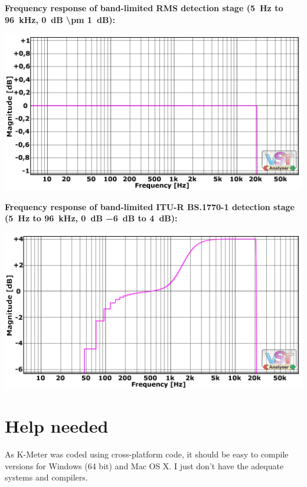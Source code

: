 \newpage %

\textbf{Frequency response of band-limited RMS detection stage
  (\SI{5}{\hertz} to \SI{96}{\kilo\hertz}, \SI{0}{\dB} \SI{\pm
    1}{\dB}):}

\begin{center}
  \includegraphics[scale=0.65,clip]{include/images/fft_192khz-freq_zoomed-rms.png}
\end{center}

\textbf{Frequency response of band-limited ITU-R BS.1770-1 detection stage
  (\SI{5}{\hertz} to \SI{96}{\kilo\hertz}, \SI{0}{\dB} \SI{-6}{\dB} to
  \SI{4}{\dB}):}

\begin{center}
  \includegraphics[scale=0.65,clip]{include/images/fft_192khz-freq_zoomed-itu_r.png}
\end{center}

\chapter{Help needed}
\label{chap:help_needed}

As K-Meter was coded using cross-platform code, it should be easy to
compile versions for Windows (\num{64} bit) and Mac OS X.  I just
don’t have the adequate systems and compilers.

